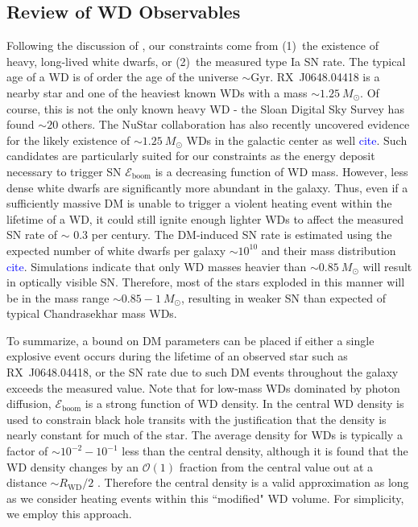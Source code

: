 \documentclass[twocolumn,showpacs,preprintnumbers,amsmath,amssymb,prd]{revtex4}
\newcommand{\Eboom}{\mathcal{E}_\text{boom}}
\newcommand{\OO}{\mathcal{O}}
\begin{document}
\subsection{Review of WD Observables}
Following the discussion of \cite{Graham:2015apa}, our constraints come from (1)~the existence of heavy, long-lived white dwarfs, or (2)~the measured type Ia SN rate. 
The typical age of a WD is of order the age of the universe $\sim \text{Gyr}$.
RX~J0648.04418 is a nearby star and one of the heaviest known WDs with a mass $\sim 1.25 ~M_{\odot}$. 
Of course, this is not the only known heavy WD - the Sloan Digital Sky Survey has found $\sim 20$ others. 
The NuStar collaboration has also recently uncovered evidence for the likely existence of $\sim 1.25 ~M_{\odot}$ WDs in the galactic center as well \textcolor{blue}{cite}.
Such candidates are particularly suited for our constraints as the energy deposit necessary to trigger SN $\Eboom$ is a decreasing function of WD mass. 
However, less dense white dwarfs are significantly more abundant in the galaxy.
Thus, even if a sufficiently massive DM is unable to trigger a violent heating event within the lifetime of a WD, it could still ignite enough lighter WDs to affect the measured SN rate of $\sim $ 0.3 per century.
The DM-induced SN rate is estimated using the expected number of white dwarfs per galaxy $\sim 10^{10}$ and their mass distribution \textcolor{blue}{cite}.
Simulations indicate that only WD masses heavier than $\sim 0.85 ~M_{\odot}$ will result in optically visible SN.
Therefore, most of the stars exploded in this manner will be in the mass range $\sim 0.85 - 1 ~M_{\odot}$, resulting in weaker SN than expected of typical Chandrasekhar mass WDs.

To summarize, a bound on DM parameters can be placed if either a single explosive event occurs during the lifetime of an observed star such as RX~J0648.04418, or the SN rate due to such DM events throughout the galaxy exceeds the measured value.
Note that for low-mass WDs dominated by photon diffusion, $\Eboom$ is a strong function of WD density. 
In \cite{Graham:2015apa} the central WD density is used to constrain black hole transits with the justification that the density is nearly constant for much of the star.
The average density for WDs is typically a factor of $\sim 10^{-2} - 10^{-1}$ less than the central density, although it is found that the WD density changes by an $\OO(1)$ fraction from the central value out at a distance $\sim R_\text{WD}/2$ \cite{Chandrasekhar}. 
Therefore the central density is a valid approximation as long as we consider heating events within this ``modified" WD volume. 
For simplicity, we employ this approach.  
\end{document}
